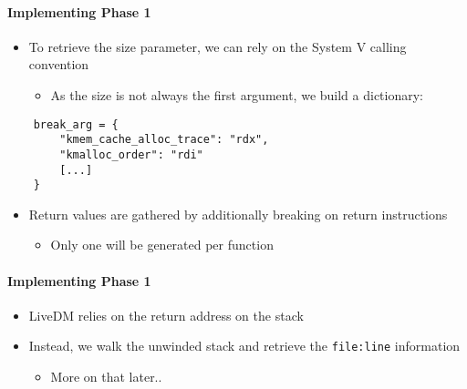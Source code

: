 \documentclass{i20lecture}
\begin{document}
\begin{frame}[fragile]{\insertsection}
  \framesubtitle{Implementing Phase 1}
    
    \begin{itemize}
     \item To retrieve the size parameter, we can rely on the System V calling convention
\pause
     \begin{itemize}
      \item As the size is not always the first argument, we build a dictionary:
     \end{itemize}
    \end{itemize}
    \begin{lstlisting}
    break_arg = {
        "kmem_cache_alloc_trace": "rdx",
        "kmalloc_order": "rdi"
        [...]
    }
    \end{lstlisting}
\pause
    \begin{itemize}
     \item Return values are gathered by additionally breaking on return instructions
     \begin{itemize}
\pause
     \item Only one will be generated per function
     \end{itemize}
    \end{itemize}
\end{frame}

\begin{frame}{\insertsection}
  \framesubtitle{Implementing Phase 1}
    
    \begin{itemize}
     \item LiveDM relies on the return address on the stack
\pause
     \item Instead, we walk the unwinded stack and retrieve the \texttt{file:line} information
\pause
     \begin{itemize}
      \item More on that later..
     \end{itemize}
    \end{itemize}
\end{frame}
\end{document}
